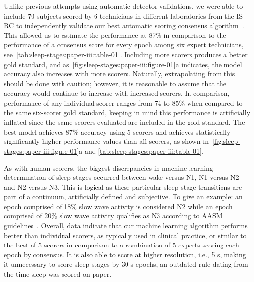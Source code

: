 Unlike previous attempts using automatic detector validations, we were able to include 70 subjects scored by 6 technicians in different laboratories from the \ac{IS-RC} to independently validate our best automatic scoring consensus algorithm~\cite{Kuna2013}.
This allowed us to estimate the performance at 87\% in comparison to the performance of a consensus score for every epoch among six expert technicians, see~\cref{tab:sleep-stages:paper-iii:table-01}.
Including more scorers produces a better gold standard, and as~\cref{fig:sleep-stages:paper-iii:figure-01}a indicates, the model accuracy also increases with more scorers.
Naturally, extrapolating from this should be done with caution; however, it is reasonable to assume that the accuracy would continue to increase with increased scorers.
In comparison, performance of any individual scorer ranges from 74 to 85\% when compared to the same six-scorer gold standard, keeping in mind this performance is artificially inflated since the same scorers evaluated are included in the gold standard. 
The best model achieves 87\% accuracy using 5 scorers and achieves statistically significantly higher performance values than all scorers, as shown in~\cref{fig:sleep-stages:paper-iii:figure-01}a and \cref{tab:sleep-stages:paper-iii:table-01}.

As with human scorers, the biggest discrepancies in machine learning determination of sleep stages occurred between wake versus \ac{N1}, \ac{N1} versus \ac{N2} and \ac{N2} versus \ac{N3}.
This is logical as these particular sleep stage transitions are part of a continuum, artificially defined and subjective.
To give an example: an epoch comprised of 18\% slow wave activity is considered \ac{N2} while an epoch comprised of 20\% slow wave activity qualifies as \ac{N3} according to \ac{AASM} guidelines~\cite{Berry2020}.
Overall, data indicate that our machine learning algorithm performs better than individual scorers, as typically used in clinical practice, or similar to the best of 5 scorers in comparison to a combination of 5 experts scoring each epoch by consensus.
It is also able to score at higher resolution, i.e., 5 s, making it unnecessary to score sleep stages by 30 s epochs, an outdated rule dating from the time sleep was scored on paper.

